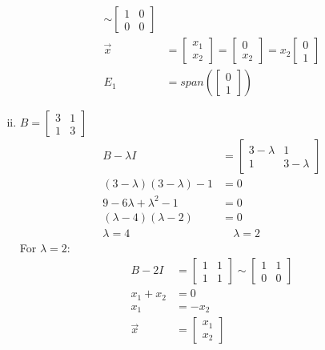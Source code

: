 \documentclass[letterpaper, 12pt]{math}
\begin{document}
\begin{enumerate}[(i)]
\begin{align*}
      \sim \begin{bmatrix}1 & 0 \\ 0 & 0\end{bmatrix} \\
    \vec{x} &= \begin{bmatrix}x_1 \\ x_2\end{bmatrix}
      = \begin{bmatrix}0 \\ x_2\end{bmatrix}
      = x_2\begin{bmatrix}0 \\ 1\end{bmatrix} \\
    E_1 &= span\left(\begin{bmatrix}0 \\ 1\end{bmatrix}\right)
  \end{align*}
  \item \( B = \begin{bmatrix}3 & 1 \\ 1 & 3\end{bmatrix} \)
  \begin{align*}
    B-\lambda I &= \begin{bmatrix}
      3-\lambda & 1 \\
      1 & 3-\lambda
    \end{bmatrix} \\
    (3-\lambda)(3-\lambda)-1 &= 0 \\
    9-6\lambda+\lambda^2-1 &= 0 \\
    (\lambda-4)(\lambda-2) &= 0 \\
    \lambda = 4 &\quad \lambda = 2
  \end{align*}
  For \( \lambda = 2 \):
  \begin{align*}
    B-2I &= \begin{bmatrix}1 & 1 \\ 1 & 1\end{bmatrix}
      \sim \begin{bmatrix}1 & 1 \\ 0 & 0\end{bmatrix} \\
    x_1+x_2 &= 0 \\
    x_1 &= -x_2 \\
    \vec{x} &= \begin{bmatrix}x_1 \\ x_2\end{bmatrix}

\end{align*}
\end{enumerate}
\end{document}
